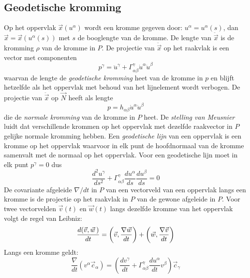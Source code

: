 \documentclass[twoside]{report}
\begin{document}
\subsection{Geodetische kromming}
Op het oppervlak $\vec{x}(u^\alpha)$ wordt een kromme gegeven door:
$u^\alpha=u^\alpha(s)$, dan $\vec{x}=\vec{x}(u^\alpha(s))$ met $s$ de booglengte
van de kromme. De lengte van $\ddot{\vec{x}}$ is de kromming $\rho$ van de
kromme in $P$. De projectie van $\ddot{\vec{x}}$ op het raakvlak is een
vector met componenten
\[
p^\gamma=\ddot{u}^\gamma+\Gamma^\gamma_{\alpha\beta}\dot{u}^\alpha\dot{u}^\beta
\]
waarvan de lengte de {\it geodetische kromming} heet van de kromme in $p$ en
blijft hetzelfde als het oppervlak met behoud van het lijnelement wordt
verbogen. De projectie van $\ddot{\vec{x}}$ op $\vec{N}$ heeft als lengte
\[
p=h_{\alpha\beta}\dot{u}^\alpha\dot{u}^\beta
\]
die de {\it normale kromming} van de kromme in $P$ heet. De {\it stelling van
Meusnier} luidt dat verschillende krommen op het oppervlak met dezelfde
raakvector in $P$ gelijke normale kromming hebben.
\npar
Een {\it geodetische lijn} van een oppervlak is een kromme op het oppervlak
waarvoor in elk punt de hoofdnormaal van de kromme samenvalt met de normaal op
het oppervlak. Voor een geodetische lijn moet in elk punt $p^\gamma=0$ dus
\[
\frac{d^2u^\gamma}{ds^2}+\Gamma^\gamma_{\alpha\beta}\frac{du^\alpha}{ds}\frac{du^\beta}{ds}=0
\]
De covariante afgeleide $\nabla/dt$ in $P$ van een vectorveld van een oppervlak
langs een kromme is de projectie op het raakvlak in $P$ van de gewone afgeleide
in $P$.
\npar
Voor twee vectorvelden $\vec{v}(t)$ en $\vec{w}(t)$ langs dezelfde kromme van
het oppervlak volgt de regel van Leibniz:
\[
\frac{d(\vec{v},\vec{w}\,)}{dt}=\left(\vec{v},\frac{\nabla\vec{w}}{dt}\right)+\left(\vec{w},\frac{\nabla\vec{v}}{dt}\right)
\]
Langs een kromme geldt:
\[
\frac{\nabla}{dt}(v^\alpha\vec{c}_\alpha)=\left(\frac{dv^\gamma}{dt}+\Gamma^\gamma_{\alpha\beta}\frac{du^\alpha}{dt}v^\beta\right)\vec{c}_\gamma
\]
\end{document}
